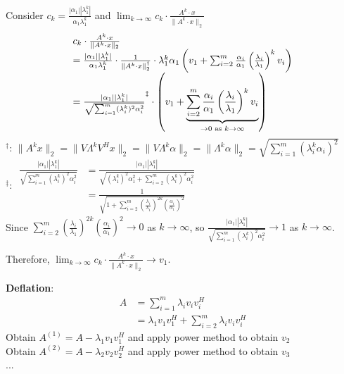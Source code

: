 \begin{multicols}{2}
\[\begin{array}{ll}
    \end{array}
\]
Consider $c_k=\frac{|\alpha_1||\lambda_1^k|}{\alpha_1\lambda_1^k}$ and $\lim_{k\to\infty} c_k\cdot \frac{A^k\cdot x}{\|A^k\cdot x\|_2}$
\[
    \begin{array}{l}
        c_k\cdot \frac{A^k\cdot x}{\|A^k\cdot x\|_2}    \\
        = \frac{|\alpha_1||\lambda_1^k|}{\alpha_1\lambda_1^k}\cdot \frac{1}{\|A^k\cdot x\|_2^\dagger}\cdot \lambda_1^k\alpha_1\left(v_1+\sum_{i=2}^m\frac{\alpha_i}{\alpha_1}\left(\frac{\lambda_i}{\lambda_1}\right)^kv_i\right) \\
        = \frac{|\alpha_1||\lambda_1^k|}{\sqrt{\sum_{i=1}^m (\lambda_i^k)^2 \alpha_i^2}}^\ddagger \cdot \left(v_1+\underbrace{\sum_{i=2}^m\frac{\alpha_i}{\alpha_1}\left(\frac{\lambda_i}{\lambda_1}\right)^kv_i}_{\to 0 \text{ \rm as }k\to \infty}\right) 
    \end{array}
\]
$^\dagger$: $\|A^kx\|_2 = \|V\Lambda^k V^H x\|_2 = \|V\Lambda^k \alpha\|_2 = \|\Lambda^k \alpha\|_2 = \sqrt{\sum_{i=1}^m(\lambda_i^k \alpha_i)^2}$ \\
$^\ddagger$:
$
    \begin{array}{ll}
        \frac{|\alpha_1||\lambda_1^k|}{\sqrt{\sum_{i=1}^m (\lambda_i^k)^2 \alpha_i^2}}  &= \frac{|\alpha_1||\lambda_1^k|}{\sqrt{(\lambda_1^k)^2 \alpha_1^2 + \sum_{i=2}^m (\lambda_i^k)^2 \alpha_i^2}} \\
                                                                                        &= \frac{1}{\sqrt{1+\sum_{i=2}^m \left(\frac{\lambda_i}{\lambda_1}\right)^{2k} \left(\frac{\alpha_i}{\alpha_1}\right)^2}}
    \end{array}
$\\
Since $\sum_{i=2}^m \left(\frac{\lambda_i}{\lambda_1}\right)^{2k} \left(\frac{\alpha_i}{\alpha_1}\right)^2 \to 0$ as $k\to \infty$, so $\frac{|\alpha_1||\lambda_1^k|}{\sqrt{\sum_{i=1}^m (\lambda_i^k)^2 \alpha_i^2}}\to 1$ as $k\to \infty$.

Therefore, $\lim_{k\to\infty} c_k\cdot \frac{A^k\cdot x}{\|A^k\cdot x\|_2}\to v_1$.

\textbf{Deflation}:
\[
    \begin{array}{ll}
        A &= \sum_{i=1}^{m} \lambda_i v_i v_i^H \\
          &= \lambda_1 v_1 v_1^H + \sum_{i=2}^{m} \lambda_i v_i v_i^H
    \end{array}
\]
Obtain $A^{(1)}=A-\lambda_1v_1v_1^H$ and apply power method to obtain $v_2$ \\
Obtain $A^{(2)}=A-\lambda_2v_2v_2^H$ and apply power method to obtain $v_3$ \\
...
\newpage
\end{multicols}